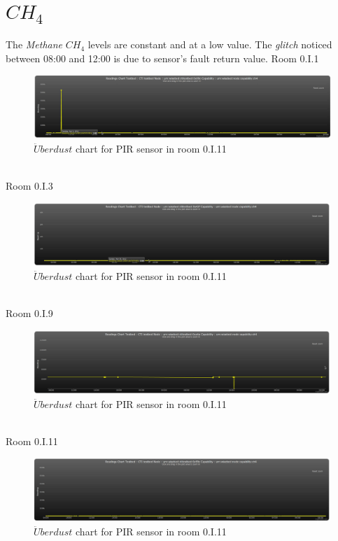 \documentclass[12pt,a4paper,draft]{report}
\begin{document}
\section{$CH_4$}
%
The \textit{Methane} $CH_4$ levels are constant and at a low value. The \textit{glitch} noticed between 08:00 and 12:00 is due to sensor's fault return value.
{Room 0.I.1}
%
\begin{figure}[H]
\centering
\includegraphics*[scale=0.3]{ch4_1}
\caption{$\ddot{U}berdust$ chart for PIR sensor in room 0.I.11}
\label{chart_ch4_1}
\end{figure}
\ \\
%
{Room 0.I.3}
%
\begin{figure}[H]
\centering
\includegraphics*[scale=0.3]{ch4_3}
\caption{$\ddot{U}berdust$ chart for PIR sensor in room 0.I.11}
\label{chart_ch4_3}
\end{figure}
\ \\
%
{Room 0.I.9}
%
\begin{figure}[H]
\centering
\includegraphics*[scale=0.3]{ch4_9}
\caption{$\ddot{U}berdust$ chart for PIR sensor in room 0.I.11}
\label{chart_ch4_9}
\end{figure}
\ \\
%
{Room 0.I.11}
%
\begin{figure}[H]
\centering
\includegraphics*[scale=0.3]{ch4_11}
\caption{$\ddot{U}berdust$ chart for PIR sensor in room 0.I.11}
\label{chart_ch4_11}
\end{figure}
\ \\
%
\end{document}
